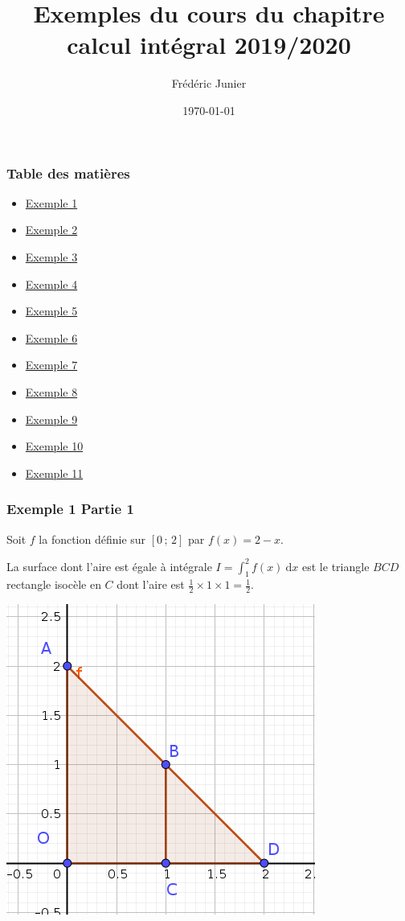 \documentclass[11pt, hyperref={urlcolor=red,%
            linkcolor=blue, %
            colorlinks=true}]{beamer}
\title[exponentielle]{Exemples du cours du chapitre calcul int\'egral 2019/2020}
\author[F.Junier]{Fr\'ed\'eric Junier}
\institute[Le Parc]{{\centering Lyc\'ee du Parc \\
1 Boulevard Anatole France \\ 69006 Lyon }}
\date[\today]{\today}
\newcommand{\Interff}[2]{\left[#1\, ;\, #2\right]}
\newcommand{\dx}{\ensuremath{\text{d}x}}		%
\newcommand{\integralex}[3]{\int_{#1}^{#2} #3 \ \dx}
\begin{document}
\frame{\titlepage}




\begin{frame}
\frametitle{Table des matières}
\begin{itemize}
	\item \hyperlink{exemple1}{Exemple 1}
	\item \hyperlink{exemple2}{Exemple 2}
	\item \hyperlink{exemple3}{Exemple 3}
	\item \hyperlink{exemple4}{Exemple 4}
	\item \hyperlink{exemple5}{Exemple 5}
	\item \hyperlink{exemple6}{Exemple 6}
		\item \hyperlink{exemple7}{Exemple 7}
			\item \hyperlink{exemple8}{Exemple 8}
			\item \hyperlink{exemple9}{Exemple 9}
				\item \hyperlink{exemple10}{Exemple 10}
						\item \hyperlink{exemple11}{Exemple 11}
\end{itemize}

\end{frame}

\begin{frame}
\frametitle{Exemple 1 Partie 1}
\label{exemple1}

Soit $f$ la fonction définie sur $\Interff{0}{2}$ par $f(x)=2-x$.

La surface dont l'aire est égale à  intégrale  $I=\integralex{1}{2}{f(x)}$ est le triangle $BCD$  rectangle isocèle en $C$  dont l'aire est $\frac{1}{2} \times 1 \times 1=\frac{1}{2}$.

\begin{center}
\includegraphics[scale=0.4]{images/exemple1.png}
\end{center}

\end{frame}
\end{document}
